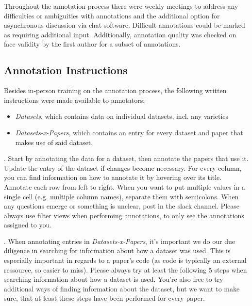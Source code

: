 Throughout the annotation process there were weekly meetings to address any difficulties or ambiguities with annotations and the additional option for asynchronous discussion via chat software. Difficult annotations could be marked as requiring additional input. Additionally, annotation quality was checked on face validity by the first author for a subset of annotations.

\subsection{Annotation Instructions}

Besides in-person training on the annotation process, the following written instructions were made available to annotators:


\begin{itemize}
    \item \emph{Datasets}, which contains data on individual datasets, incl. any varieties
    \item \emph{Datasets-x-Papers}, which contains an entry for every dataset and paper that makes use of said dataset.
\end{itemize}

.
Start by annotating the data for a dataset, then annotate the papers that use it. Update the entry of the dataset if changes become necessary.
For every column, you can find information on how to annotate it by hovering over its title.
Annotate each row from left to right.
When you want to put multiple values in a single cell (e.g. multiple column names), separate them with semicolons.
When any questions emerge or something is unclear, post in the slack channel.
Please always use filter views when performing annotations, to only see the annotations assigned to you.

.
When annotating entries in \emph{Datasets-x-Papers}, it's important we do our due diligence in searching for information about how a dataset was used.
This is especially important in regards to a paper's code (as code is typically an external ressource, so easier to miss). 
Please always try at least the following 5 steps when searching information about how a dataset is used.
You're also free to try additional ways of finding information about the dataset, but we want to make sure, that at least these steps have been performed for every paper.

